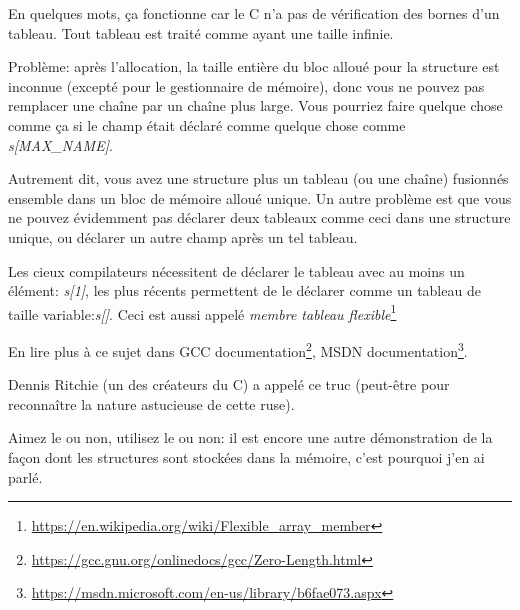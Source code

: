 En quelques mots, ça fonctionne car le C n'a pas de vérification des bornes d'un
tableau. Tout tableau est traité comme ayant une taille infinie.

Problème: après l'allocation, la taille entière du bloc alloué pour la structure
est inconnue (excepté pour le gestionnaire de mémoire), donc vous ne pouvez pas remplacer
une chaîne par un chaîne plus large.
Vous pourriez faire quelque chose comme ça si le champ était déclaré comme quelque
chose comme \emph{s[MAX\_NAME]}.

Autrement dit, vous avez une structure plus un tableau (ou une chaîne) fusionnés
ensemble dans un bloc de mémoire alloué unique.
Un autre problème est que vous ne pouvez évidemment pas déclarer deux tableaux comme
ceci dans une structure unique, ou déclarer un autre champ après un tel tableau.

Les cieux compilateurs nécessitent de déclarer le tableau avec au moins un élément:
\emph{s[1]}, les plus récents permettent de le déclarer comme un tableau de taille
variable:\emph{s[]}.
Ceci est aussi appelé \emph{membre tableau flexible}\footnote{\url{https://en.wikipedia.org/wiki/Flexible_array_member}}

En lire plus à ce sujet dans
GCC documentation\footnote{\url{https://gcc.gnu.org/onlinedocs/gcc/Zero-Length.html}},
MSDN documentation\footnote{\url{https://msdn.microsoft.com/en-us/library/b6fae073.aspx}}.

Dennis Ritchie (un des créateurs du C) a appelé ce truc  (peut-être pour reconnaître la nature astucieuse de cette ruse).

Aimez le ou non, utilisez le ou non:
il est encore une autre démonstration de la façon dont les structures sont stockées
dans la mémoire, c'est pourquoi j'en ai parlé.

